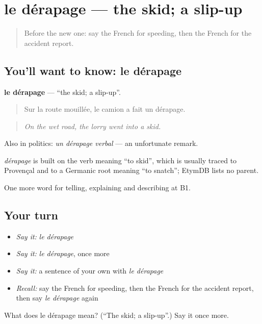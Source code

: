 \section[le dérapage]{le dérapage — the skid; a slip-up}

\label{lesson:FR-C297-derapage}



\begin{quote}
Before the new one: say the French for speeding, then the French for the accident report.
\end{quote}

\subsection*{You'll want to know: le dérapage}
\textbf{le dérapage} — \textquotedblleft{}the skid; a slip-up\textquotedblright{}.

\begin{quote}
Sur la route mouillée, le camion a fait un dérapage.
\end{quote}

\begin{quote}
\emph{On the wet road, the lorry went into a skid.}
\end{quote}

Also in politics: \emph{un dérapage verbal} — an unfortunate remark.

\begin{cousinweb}
\emph{dérapage} is built on the verb meaning \textquotedblleft{}to skid\textquotedblright{}, which is usually traced to Provençal and to a Germanic root meaning \textquotedblleft{}to snatch\textquotedblright{}; EtymDB lists no parent.
\end{cousinweb}

\begin{grammarlens}[title={What you've built}]
One more word for telling, explaining and describing at B1.
\end{grammarlens}

\subsection*{Your turn}
\begin{itemize}
\raggedright
  \item \emph{Say it:} \emph{le dérapage}
  \item \emph{Say it:} \emph{le dérapage}, once more
  \item \emph{Say it:} a sentence of your own with \emph{le dérapage}
  \item \emph{Recall:} say the French for speeding, then the French for the accident report, then say \emph{le dérapage} again
\end{itemize}

\begin{tcolorbox}[breakable,colback=teal!4,colframe=teal!35!black,title={Before you move on}]
What does le dérapage mean? (\textquotedblleft{}The skid; a slip-up\textquotedblright{}.) Say it once more.
\end{tcolorbox}
